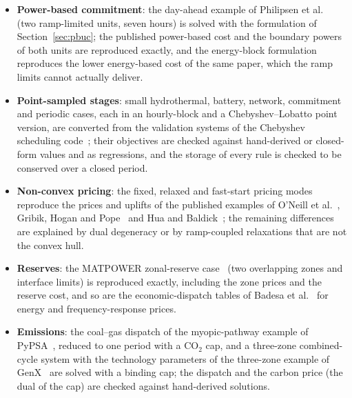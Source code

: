 \begin{itemize}
    block formulation of Section~\ref{sec:sc}, applied to the same hours
    as one non-chronological stage, is checked to remain a relaxation of
    the chronological commitment.
  \item \textbf{Power-based commitment}: the day-ahead example of
    Philipsen et al.~\cite{philipsen2019trading} (two ramp-limited
    units, seven hours) is solved with the formulation of
    Section~\ref{sec:pbuc}; the published power-based cost and the
    boundary powers of both units are reproduced exactly, and the
    energy-block formulation reproduces the lower energy-based cost of
    the same paper, which the ramp limits cannot actually deliver.
  \item \textbf{Point-sampled stages}: small hydrothermal, battery,
    network, commitment and periodic cases, each in an hourly-block and
    a Chebyshev--Lobatto point version, are converted from the
    validation systems of the Chebyshev scheduling
    code~\cite{matus2015chebyshev}; their objectives are checked
    against hand-derived or closed-form values and as regressions, and
    the storage of every rule is checked to be conserved over a closed
    period.
  \item \textbf{Non-convex pricing}: the fixed, relaxed and fast-start
    pricing modes reproduce the prices and uplifts of the published
    examples of O'Neill et al.~\cite{oneill2005pricing}, Gribik, Hogan
    and Pope~\cite{gribik2007convexhull} and Hua and
    Baldick~\cite{hua2017convexhull}; the remaining differences are
    explained by dual degeneracy or by ramp-coupled relaxations that are
    not the convex hull.
  \item \textbf{Reserves}: the MATPOWER zonal-reserve
    case~\cite{matpower_case30} (two overlapping zones and interface
    limits) is reproduced exactly, including the zone prices and the
    reserve cost, and so are the economic-dispatch tables of Badesa et
    al.~\cite{badesa2020pricing} for energy and frequency-response
    prices.
  \item \textbf{Emissions}: the coal--gas dispatch of the
    myopic-pathway example of PyPSA~\cite{brown2018pypsa}, reduced to
    one period with a CO$_2$ cap, and a three-zone combined-cycle
    system with the technology parameters of the three-zone example of
    GenX~\cite{jenkins2017genx} are solved with a binding cap; the
    dispatch and the carbon price (the dual of the cap) are checked
    against hand-derived solutions.
\end{itemize}

